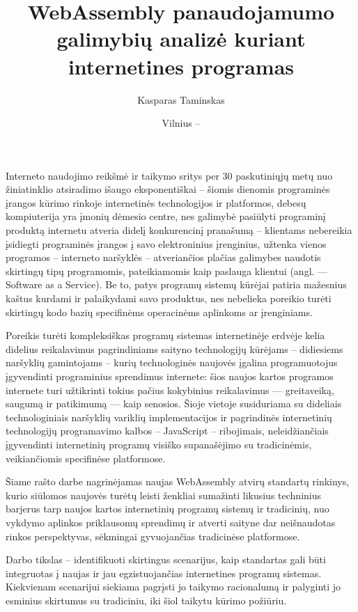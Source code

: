 \documentclass{VUMIFPSkursinis}
\title{WebAssembly panaudojamumo galimybių analizė kuriant internetines programas }
\author{Kasparas Taminskas}
\date{Vilnius – \the\year}
\begin{document}
\lstset{language=C}

\maketitle
\cleardoublepage{}

\setcounter{page}{2}
\tableofcontents

Interneto naudojimo reikšmė ir taikymo sritys per 30 paskutiniųjų metų nuo žiniatinklio atsiradimo išaugo 
eksponentiškai – šiomis dienomis programinės įrangos kūrimo rinkoje internetinės technologijos ir 
platformos, debesų kompiuterija yra įmonių dėmesio centre, nes galimybė pasiūlyti programinį 
produktą internetu atveria didelį konkurencinį pranašumą – klientams nebereikia įsidiegti 
programinės įrangos į savo elektroninius įrenginius, užtenka vienos programos – interneto 
naršyklės – atveriančios plačias galimybes naudotis skirtingų tipų programomis, pateikiamomis 
kaip paslauga klientui (angl. — Software as a Service). Be to, patys programų sistemų kūrėjai 
patiria mažesnius kaštus kurdami ir palaikydami savo produktus, nes nebelieka poreikio turėti 
skirtingų kodo bazių specifinėms operacinėms aplinkoms ar įrenginiams.

Poreikis turėti kompleksiškas programų sistemas internetinėje erdvėje kelia didelius 
reikalavimus pagrindiniams saityno technologijų kūrėjams – didiesiems naršyklių gamintojams – 
kurių technologinės naujovės įgalina programuotojus įgyvendinti programinius sprendimus 
internete: šios naujos kartos programos internete turi užtikrinti tokius pačius kokybinius 
reikalavimus — greitaveiką, saugumą ir patikimumą — kaip senosios. Šioje vietoje susiduriama 
su dideliais technologiniais naršyklių variklių implementacijos ir pagrindinės internetinių 
technologijų programavimo kalbos – JavaScript – ribojimais, neleidžiančiais įgyvendinti 
internetinių programų visiško supanašėjimo su tradicinėmis, veikiančiomis specifinėse 
platformose. 

Šiame rašto darbe nagrinėjamas naujas WebAssembly atvirų standartų rinkinys, kurio siūlomos naujovės turėtų leisti ženkliai sumažinti likusius techninius barjerus tarp 
naujos kartos internetinių programų sistemų ir tradicinių, nuo vykdymo aplinkos priklausomų 
sprendimų ir atverti saityne dar neišnaudotas rinkos perspektyvas, sėkmingai gyvuojančias
tradicinėse platformose. 

Darbo tikslas – identifikuoti skirtingus scenarijus, kaip standartas 
gali būti integruotas į naujas ir jau egzistuojančias internetines programų sistemas. Kiekvienam scenarijui siekiama pagrįsti jo taikymo racionalumą ir palyginti jo esminius skirtumus su tradiciniu, iki šiol taikytu kūrimo požiūriu. 
\end{document}
